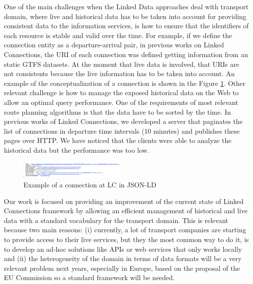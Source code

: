 \documentclass[sw]{iosart2x}
\begin{document}
One of the main challenges when the Linked Data approaches deal with transport domain, where live and historical data has to be taken into account for providing consistent data to the information services, is how to ensure that the identifiers of each resource is stable and valid over the time. For example, if we define the connection entity as a departure-arrival pair, in previous works on Linked Connections\cite{colpaert2015intermodal}, the URI of each connection was defined getting information from an static GTFS datasets. At the moment that live data is involved, that URIs are not consistents because the live information has to be taken into account. An example of the conceptualization of a connection is shown in the Figure \ref{fig:connection}. Other relevant challenge is how to manage the exposed historical data on the Web to allow an optimal query performance. One of the requirements of most relevant route planning algorithms is that the data have to be sorted by the time. In previous works of Linked Connections\cite{rojas2017providing}, we developed a server that paginates the list of connections in departure time intervals (10 minutes) and publishes these pages over HTTP. We have noticed that the clients were able to analyze the historical data but the performance was too low.

\begin{figure}[t]
	\includegraphics[width=0.47\textwidth]{images/connection.png}
	\caption{Example of a connection at LC in JSON-LD}\label{fig:connection}
\end{figure}

Our work is focused on providing an improvement of the current state of Linked Connections framework by allowing an efficient management of historical and live data with a standard vocabulary for the transport domain. This is relevant because two main reasons: (i) currently, a lot of transport companies are starting to provide access to their live services, but they the most common way to do it, is to develop an ad-hoc solutions like APIs or web services that only works locally \cite{colpaert2016public} and (ii) the heterogeneity of the domain in terms of data formats will be a very relevant problem next years, especially in Europe, based on the proposal of the EU Commission so a standard framework will be needed.  
\end{document}

